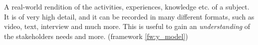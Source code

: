 \begin{tool} \label{tool:user_story} 
  A real-world rendition of the activities, experiences, knowledge etc. of a subject. It is of very high detail, and it can be recorded in many different formats, such as video, text, interview and much more. This is useful to gain an \emph{understanding} of the stakeholders needs and more. (framework \ref{fw:y_model}) \cite[p. 62-63]{benyon_14}
\end{tool}
